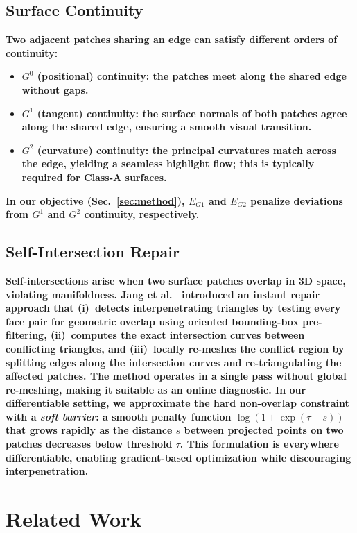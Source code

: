 \documentclass{ieeeaccess}
\providecommand{\DIFaddtex}[1]{{\color{blue}\bfseries #1}} %
\providecommand{\DIFaddbegin}{} %
\providecommand{\DIFaddend}{} %
\providecommand{\DIFadd}[1]{\texorpdfstring{\DIFaddtex{#1}}{#1}} %
\begin{document}
\subsection{\DIFadd{Surface Continuity}}
\DIFadd{Two adjacent patches sharing an edge can satisfy different orders of continuity:
}\begin{itemize}
  \item \DIFadd{\textbf{$G^0$ (positional) continuity:} the patches meet along the shared edge without gaps.
  }\item \DIFadd{\textbf{$G^1$ (tangent) continuity:} the surface normals of both patches agree along the shared edge, ensuring a smooth visual transition.
  }\item \DIFadd{\textbf{$G^2$ (curvature) continuity:} the principal curvatures match across the edge, yielding a seamless highlight flow; this is typically required for Class-A surfaces.
}\end{itemize}
\DIFadd{In our objective (Sec.~\ref{sec:method}), $E_{G1}$ and $E_{G2}$ penalize deviations from $G^1$ and $G^2$ continuity, respectively.
}

\subsection{\DIFadd{Self-Intersection Repair}}
\DIFadd{Self-intersections arise when two surface patches overlap in 3D space, violating manifoldness.
Jang et al.~\cite{b12} introduced an instant repair approach that
(i)~detects interpenetrating triangles by testing every face pair for
geometric overlap using oriented bounding-box pre-filtering,
(ii)~computes the exact intersection curves between conflicting
triangles, and (iii)~locally re-meshes the conflict region by splitting
edges along the intersection curves and re-triangulating the affected
patches. The method operates in a single pass without global re-meshing,
making it suitable as an online diagnostic.
In our differentiable setting, we approximate the hard non-overlap constraint with a
\emph{soft barrier}: a smooth penalty function
$\log(1+\exp(\tau-s))$ that grows rapidly as the distance $s$ between projected
points on two patches decreases below threshold $\tau$.
This formulation is everywhere differentiable, enabling gradient-based
optimization while discouraging interpenetration.
}

\DIFaddend \section{Related Work}
\label{sec:related}
\DIFaddbegin 
\end{document}
